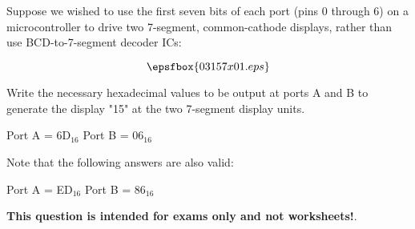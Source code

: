 

Suppose we wished to use the first seven bits of each port (pins 0 through 6) on a microcontroller to drive two 7-segment, common-cathode displays, rather than use BCD-to-7-segment decoder ICs:

$$\epsfbox{03157x01.eps}$$

Write the necessary hexadecimal values to be output at ports A and B to generate the display "15" at the two 7-segment display units.







Port A = 6D$_{16}$ \hskip 50pt Port B = 06$_{16}$

\vskip 10pt

\noindent
Note that the following answers are also valid:

Port A = ED$_{16}$ \hskip 50pt Port B = 86$_{16}$







{\bf This question is intended for exams only and not worksheets!}.




